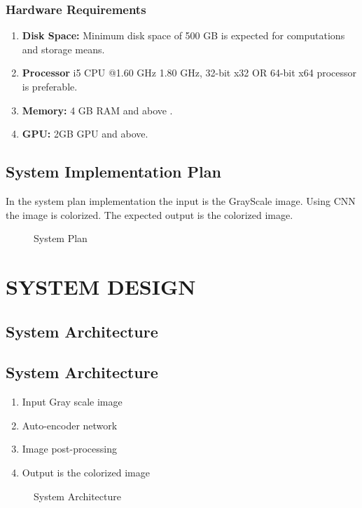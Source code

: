 \documentclass[12pt]{report}	%
\newcommand{\squeezeup}{\vspace{-0.6cm}}
\begin{document}
\subsection{Hardware Requirements}
\begin{enumerate}
	\item{\bf Disk Space: } Minimum disk space of 500 GB is expected for computations and storage means.
	\item{\bf Processor} i5 CPU @1.60 GHz 1.80 GHz, 32-bit x32 OR 64-bit x64 processor is preferable.	
	\item{\bf Memory: } 4 GB RAM and above .
	\item{\bf GPU: } 2GB GPU and above.
\end{enumerate}
\section{System Implementation Plan}
In the system plan implementation the input is the GrayScale image. Using CNN the image is colorized. The expected output is the colorized image.
\begin{figure}[!h]
	\captionsetup{font=scriptsize}
	\begin{center}
		{}
		\caption{System Plan}
		\label{fig:2}
	\end{center}
	\squeezeup
\end{figure}

\chapter{SYSTEM DESIGN}

\section{System Architecture}
\section{System Architecture}
\begin{enumerate}
\item Input Gray scale image
\item Auto-encoder network
\item Image post-processing
\item Output is the colorized image
\end{enumerate}
\begin{figure}[!h]
	\captionsetup{font=scriptsize}
	\begin{center}
		{}
		\caption{System Architecture}
		\label{fig:3}
	\end{center}
	\squeezeup
\end{figure}
\newpage
\end{document}
